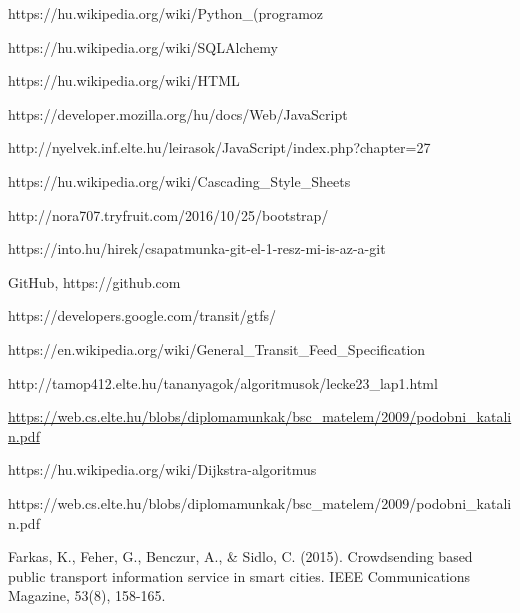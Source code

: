 \begin{thebibliography}{x}

 https://hu.wikipedia.org/wiki/Python\_(programoz%


 https://hu.wikipedia.org/wiki/SQLAlchemy

 https://hu.wikipedia.org/wiki/HTML

 https://developer.mozilla.org/hu/docs/Web/JavaScript

 http://nyelvek.inf.elte.hu/leirasok/JavaScript/index.php?chapter=27

 https://hu.wikipedia.org/wiki/Cascading\_Style\_Sheets

 http://nora707.tryfruit.com/2016/10/25/bootstrap/

 https://into.hu/hirek/csapatmunka-git-el-1-resz-mi-is-az-a-git

 GitHub, https://github.com

https://developers.google.com/transit/gtfs/

https://en.wikipedia.org/wiki/General\_Transit\_Feed\_Specification

http://tamop412.elte.hu/tananyagok/algoritmusok/lecke23\_lap1.html

\url{https://web.cs.elte.hu/blobs/diplomamunkak/bsc\_matelem/2009/podobni\_katalin.pdf}

https://hu.wikipedia.org/wiki/Dijkstra-algoritmus

https://web.cs.elte.hu/blobs/diplomamunkak/bsc\_matelem/2009/podobni\_katalin.pdf

Farkas, K., Feher, G., Benczur, A., \& Sidlo, C. (2015). Crowdsending based public transport information service in smart cities. IEEE Communications Magazine, 53(8), 158-165.

\end{thebibliography}
